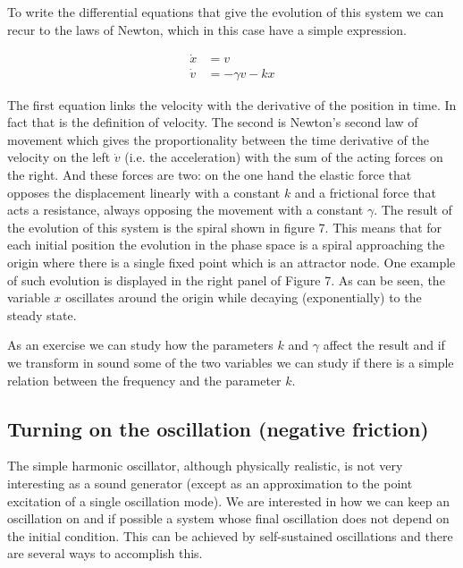 \documentclass{article}
\begin{document}
To write the differential equations that give the evolution of this system we can recur to the laws of Newton, which in this case have a simple expression. 

\begin{subequations} \label{eq_harmosc}
\begin{align}
    \dot{x} & = v \\
    \dot{v} & = -\gamma v -kx 
\end{align}
\end{subequations}

The first equation links the velocity with the derivative of the position in time. 
In fact that is the definition of velocity. 
The second is Newton's second law of movement which gives the proportionality between the time derivative of the velocity on the left $\dot v$ (i.e. the acceleration) with the sum of the acting forces on the right. 
And these forces are two: on the one hand the elastic force that opposes the displacement linearly with a constant $k$ and a frictional force that acts a resistance, always opposing the movement with a constant $\gamma$. 
The result of the evolution of this system is the spiral shown in figure 7. 
This means that for each initial position the evolution in the phase space is a spiral approaching the origin where there is a single fixed point which is an attractor node. One example of such evolution is displayed in the right panel of Figure 7. As can be seen, the variable $x$ oscillates around the origin while decaying (exponentially) to the steady state.

As an exercise we can study how the parameters $k$ and $\gamma$ affect the result and if we transform in sound some of the two variables we can study if there is a simple relation between the frequency and the parameter $k$.

\subsection{Turning on the oscillation (negative friction)}

The simple harmonic oscillator, although physically realistic, is not very interesting as a sound generator (except as an approximation to the point excitation of a single oscillation mode). 
We are interested in how we can keep an oscillation on and if possible a system whose final oscillation does not depend on the initial condition. 
This can be achieved by self-sustained oscillations and there are several ways to accomplish this. 
\end{document}
